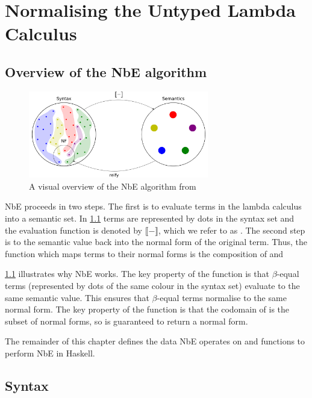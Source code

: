\chapter{Normalising the Untyped Lambda Calculus}
\label{chap:untypednbe}

\section{Overview of the NbE algorithm}

\begin{figure}[h]
    \centering
    \includegraphics[width=0.7\textwidth]{./images/nbe_diagram}
    \caption{A visual overview of the NbE algorithm from \cite{slides}}
    \label{fig:nbeOverview}
\end{figure}

NbE proceeds in two steps. The first is to evaluate terms in the lambda calculus into a semantic set. In \ref{fig:nbeOverview} terms are represented by dots in the syntax set and the evaluation function is denoted by $\llbracket - \rrbracket$, which we refer to as . The second step is to  the semantic value back into the normal form of the original term. Thus, the  function which maps terms to their normal forms is the composition of  and 

\ref{fig:nbeOverview} illustrates why NbE works. The key property of the  function is that $\beta$-equal terms (represented by dots of the same colour in the syntax set) evaluate to the same semantic value. This ensures that $\beta$-equal terms normalise to the same normal form. The key property of the  function is that the codomain of  is the subset of normal forms, so  is guaranteed to return a normal form. 

The remainder of this chapter defines the data NbE operates on and functions to perform NbE in Haskell.

\section{Syntax}

